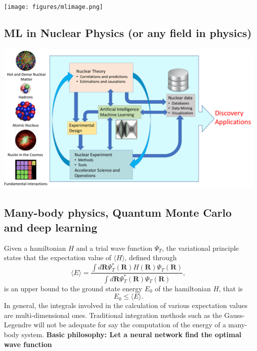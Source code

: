 \documentclass[%
oneside,                 %
final,                   %
10pt]{article}
\begin{document}
\vspace{6mm}

\centerline{\texttt{[image: figures/mlimage.png]}}

\vspace{6mm}

\subsection{ML in Nuclear  Physics (or any field in physics)}

\vspace{6mm}

\centerline{\includegraphics[width=1.0\linewidth]{figures/ML-NP.pdf}}

\vspace{6mm}

\subsection{Many-body physics, Quantum Monte Carlo and deep learning}
\begin{block}{}
Given a hamiltonian $H$ and a trial wave function $\Psi_T$, the variational principle states that the expectation value of $\langle H \rangle$, defined through 
\[
   \langle E \rangle =
   \frac{\int d\bm{R}\Psi^{\ast}_T(\bm{R})H(\bm{R})\Psi_T(\bm{R})}
        {\int d\bm{R}\Psi^{\ast}_T(\bm{R})\Psi_T(\bm{R})},
\]
is an upper bound to the ground state energy $E_0$ of the hamiltonian $H$, that is 
\[
    E_0 \le \langle E \rangle.
\]
In general, the integrals involved in the calculation of various  expectation values  are multi-dimensional ones. Traditional integration methods such as the Gauss-Legendre will not be adequate for say the  computation of the energy of a many-body system.  \textbf{Basic philosophy: Let a neural network find the optimal wave function}
\end{block}
\end{document}
